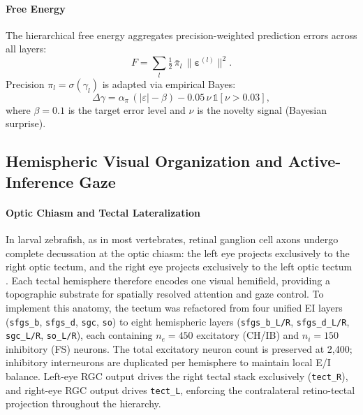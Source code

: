 \documentclass[12pt]{article}
\begin{document}
\paragraph{Free Energy}

The hierarchical free energy aggregates precision-weighted prediction
errors across all layers:
\begin{equation}\label{eq:free_energy}
  F = \sum_{l} \tfrac{1}{2}\,\bar{\pi}_l\,
      \bigl\|\boldsymbol{\varepsilon}^{(l)}\bigr\|^2.
\end{equation}
Precision $\pi_l = \sigma(\gamma_l)$ is adapted via empirical Bayes:
\begin{equation}\label{eq:precision}
  \Delta\gamma = \alpha_\pi\,(|\varepsilon| - \beta)
    - 0.05\,\nu\,\mathbb{1}[\nu > 0.03],
\end{equation}
where $\beta = 0.1$ is the target error level and $\nu$ is the
novelty signal (Bayesian surprise).

\subsection{Hemispheric Visual Organization and Active-Inference Gaze}\label{sec:hemispheric}

\paragraph{Optic Chiasm and Tectal Lateralization}

In larval zebrafish, as in most vertebrates, retinal ganglion cell axons
undergo complete decussation at the optic chiasm: the left eye projects
exclusively to the right optic tectum, and the right eye projects exclusively
to the left optic tectum \citep{baier2013}.
Each tectal hemisphere therefore encodes one visual hemifield, providing a
topographic substrate for spatially resolved attention and gaze control.
To implement this anatomy, the tectum was refactored from four
unified EI layers (\texttt{sfgs\_b}, \texttt{sfgs\_d}, \texttt{sgc},
\texttt{so}) to eight hemispheric layers
(\texttt{sfgs\_b\_L/R}, \texttt{sfgs\_d\_L/R},
\texttt{sgc\_L/R}, \texttt{so\_L/R}),
each containing $n_e = 450$ excitatory (CH/IB) and $n_i = 150$ inhibitory
(FS) neurons.
The total excitatory neuron count is preserved at 2,400; inhibitory
interneurons are duplicated per hemisphere to maintain local E/I balance.
Left-eye RGC output drives the right tectal stack exclusively
(\texttt{tect\_R}), and right-eye RGC output drives \texttt{tect\_L},
enforcing the contralateral retino-tectal projection
throughout the hierarchy.
\end{document}
